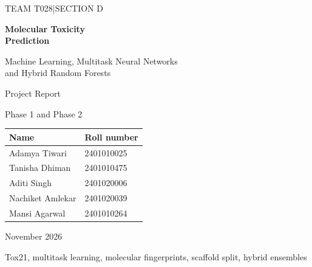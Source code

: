 \documentclass[conference]{IEEEtran}
\begin{document}
\onecolumn
\begin{titlepage}
\centering
\vspace*{22mm}
{\large\sffamily TEAM T028\quad |\quad SECTION D\par}
\vspace{18mm}
{\Huge\bfseries Molecular Toxicity\\[6pt] Prediction\par}
\vspace{12mm}
{\Large Machine Learning, Multitask Neural Networks\\[5pt]
and Hybrid Random Forests\par}
\vspace{15mm}
{\large Project Report\par}
\vspace{3mm}
{\large Phase 1 and Phase 2\par}
\vfill
{\large
\begin{tabular}{ll}
\toprule
\textbf{Name} & \textbf{Roll number}\\\midrule
Adamya Tiwari & 2401010025\\
Tanisha Dhiman & 2401010475\\
Aditi Singh & 2401020006\\
Nachiket Amlekar & 2401020039\\
Mansi Agarwal & 2401010264\\\bottomrule
\end{tabular}\par}
\vspace{18mm}
{\large November 2026\par}
\vspace{10mm}
\end{titlepage}
\twocolumn
\begin{abstract}
We compare classical machine learning, residual multitask deep learning, feature-fusion forests and probability blending for 12 Tox21 assays. The dataset contains 7,823 validated molecules, split into 6,259 training, 782 validation and 782 test compounds. Molecules use 2,048 Morgan bits and five standardized descriptors, with unmeasured labels masked. The current neural model achieves test macro ROC-AUC 0.7266 and average precision 0.3298. Feature fusion achieves 0.7156/0.3284, stronger raw-feature RF 0.7674/0.4063 and the validation-selected 80/20 RF--DL blend 0.7685/0.3983. The historical Phase 1 RF reports 0.7541/0.3962. Most ROC-AUC improvement comes from the stronger forest; blending adds 0.0011 ROC-AUC while lowering average precision. The application serves the current residual model, stronger forest, feature-fusion model and probability blend. Earlier-network ablations are retained as separate experiments.
\end{abstract}
\begin{IEEEkeywords}Tox21, multitask learning, molecular fingerprints, scaffold split, hybrid ensembles\end{IEEEkeywords}
\end{document}

